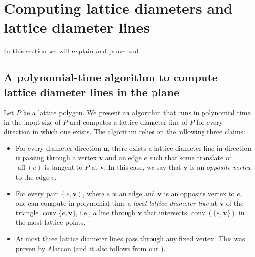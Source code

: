 \documentclass[11pt]{article}
\newcommand{\bu}{\mathbf{u}}
\newcommand{\bv}{\mathbf{v}}
\newcommand{\Z}{\mathbb{Z}}
\DeclareMathOperator{\conv}{conv}
\DeclareMathOperator{\aff}{aff}
\begin{document}
\section{Computing lattice diameters and lattice diameter lines}\label{sec:LD-computation}

In this section we will explain and prove  and .

\subsection{A polynomial-time algorithm to compute lattice diameter lines in the plane}\label{sec:LD-poly}

Let $P$ be a lattice polygon. We present an algorithm that runs in polynomial time in the input size of $P$ and computes a lattice diameter line of $P$ for every direction in which one exists. 
The algorithm relies on the following three claims:
\begin{itemize}
    \item For every diameter direction $\bu$, there exists a lattice diameter line in direction $\bu$ passing through a vertex $\bv$ and an edge $e$ such that some translate of $\aff(e)$ is tangent to $P$ at $\bv$. In this case, we say that $\bv$ is an \textit{opposite vertex} to the edge $e$. %
    \item For every pair $(e,\bv)$, where $e$ is an edge and $\bv$ is an opposite vertex to $e$, one can compute in polynomial time a \textit{local lattice diameter line} at $\bv$ of the triangle $\conv \{ e, \bv\}$, i.e., a line through $\bv$ that intersects $\conv(\{e,\bv\})$ in the most lattice points.
    \item At most three lattice diameter lines pass through any fixed vertex. This was proven by Alarcon \cite[Lemma 2.4]{Alarcon_PhD} (and it also follows from our ).
\end{itemize}
\end{document}
